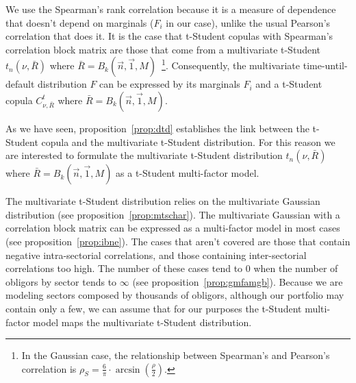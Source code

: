 \documentclass[11pt,fleqn]{book} %
\begin{document}
We use the Spearman's rank correlation because it is a measure of dependence 
that doesn't depend on marginals ($F_i$ in our case), unlike the usual
Pearson's correlation that does it. It is the case that t-Student copulas 
with Spearman's correlation block matrix are those that come from a 
multivariate t-Student $t_n(\nu,\bar{R})$ where 
$\bar{R} = B_k(\vec{n},\vec{1},M)$~\footnote{ In the Gaussian case, the 
relationship between Spearman's and Pearson's correlation is 
$\rho_S = \frac{6}{\pi}\cdot \arcsin(\frac{\rho}{2})$.}.
Consequently, the multivariate time-until-default distribution $F$ can be 
expressed by its marginals $F_i$ and a t-Student copula $C_{\nu,\bar{R}}^t$
where $\bar{R} = B_k(\vec{n},\vec{1},M)$.

As we have seen, proposition~\ref{prop:dtd} establishes the link between the 
t-Student copula and the multivariate t-Student distribution. For this reason
we are interested to formulate the multivariate t-Student distribution 
$t_n(\nu,\bar{R})$ where $\bar{R} = B_k(\vec{n},\vec{1},M)$ as a t-Student
multi-factor model.

The multivariate t-Student distribution relies on the multivariate Gaussian
distribution (see proposition~\ref{prop:mtschar}). The multivariate Gaussian 
with a correlation block matrix can be expressed as a multi-factor model in 
most cases (see proposition~\ref{prop:ibne}). The cases that aren't covered 
are those that contain negative intra-sectorial correlations, and those 
containing inter-sectorial correlations too high. The number of these cases 
tend to $0$ when the number of obligors by sector tends to $\infty$ (see 
proposition~\ref{prop:gmfamgb}). Because we are modeling sectors composed 
by thousands of obligors, although our portfolio may contain only a few, we 
can assume that for our purposes the t-Student multi-factor model maps the 
multivariate t-Student distribution.
\end{document}
